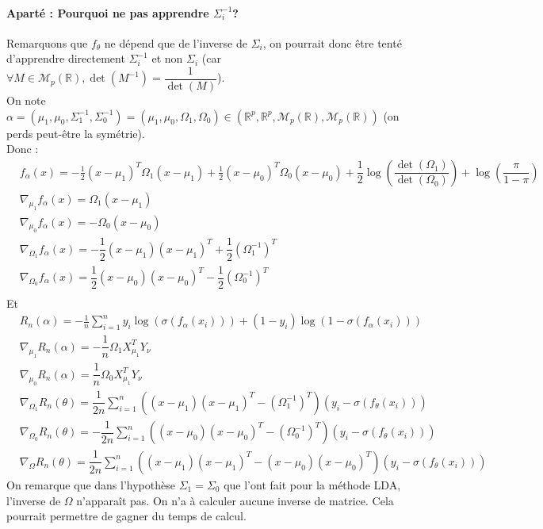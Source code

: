 \documentclass[paper=a4, fontsize=11pt]{article}
\begin{document}
\paragraph{Aparté : Pourquoi ne pas apprendre $\Sigma_i^{-1}$?\\}
Remarquons que $f_{\theta}$ ne dépend que de l'inverse de $\Sigma_i$, on pourrait donc être tenté d'apprendre directement $\Sigma_i^{-1}$ et non $\Sigma_i$ (car $\forall M\in \mathcal{M}_{p}(\mathbb{R}), \det(M^{-1}) = \dfrac{1}{\det(M)}$).\\
On note $\alpha = (\mu_1,\mu_0,\Sigma_1^{-1},\Sigma_0^{-1}) =  (\mu_1,\mu_0,\Omega_1,\Omega_0)\in (\mathbb{R}^{p},\mathbb{R}^{p},\mathcal{M}_{p}(\mathbb{R}),\mathcal{M}_{p}(\mathbb{R}))$ (on perds peut-être la symétrie).\\
Donc : 
\begin{align*}
&f_{\alpha}(x) = -\frac{1}{2}(x-\mu_1)^{T}\Omega_1(x-\mu_1) +  \frac{1}{2}(x-\mu_0)^{T}\Omega_0(x-\mu_0) + \dfrac{1}{2}\log(\dfrac{\det(\Omega_1)}{\det(\Omega_0)}) + \log(\dfrac{\pi}{1-\pi})\\
&\nabla_{\mu_1}f_{\alpha}(x) = \Omega_{1}(x-\mu_{1}) \\
&\nabla_{\mu_0}f_{\alpha}(x) = -\Omega_{0}(x-\mu_{0}) \\
&\nabla_{\Omega_1}f_{\alpha}(x) = -\dfrac{1}{2}(x-\mu_{1})(x-\mu_{1})^{T} +\dfrac{1}{2}(\Omega_1^{-1})^{T}\\
&\nabla_{\Omega_0}f_{\alpha}(x) = \dfrac{1}{2}(x-\mu_{0})(x-\mu_{0})^{T} - \dfrac{1}{2}(\Omega_0^{-1})^{T}\\
\end{align*}
Et 
\begin{align*}
&R_n(\alpha) = -\frac{1}{n}\sum\limits_{i=1}^{n} y_i\log (\sigma(f_{\alpha}(x_i))) + (1-y_i)\log(1-\sigma(f_{\alpha}(x_i)))\\
&\nabla_{\mu_1}R_n(\alpha) = -\dfrac{1}{n}\Omega_{1} X_{\mu_1}^{T}Y_{\nu}\\
&\nabla_{\mu_0}R_n(\alpha) =  \dfrac{1}{n}\Omega_{0} X_{\mu_1}^{T}Y_{\nu}\\
&\nabla_{\Omega_1}R_n(\theta) = \dfrac{1}{2n}\sum\limits_{i=1}^{n}   ((x-\mu_{1})(x-\mu_{1})^{T} -(\Omega_1^{-1})^{T}) (y_i - \sigma(f_{\theta}(x_i))) \\
&\nabla_{\Omega_0}R_n(\theta) = -\dfrac{1}{2n}\sum\limits_{i=1}^{n}   ((x-\mu_{0})(x-\mu_{0})^{T} -(\Omega_0^{-1})^{T}) (y_i - \sigma(f_{\theta}(x_i))) \\
&\nabla_{\Omega}R_n(\theta) = \dfrac{1}{2n}\sum\limits_{i=1}^{n}   ((x-\mu_{1})(x-\mu_{1})^{T}-(x-\mu_{0})(x-\mu_{0})^{T} ) (y_i - \sigma(f_{\theta}(x_i))) 
\end{align*}
On remarque que dans l'hypothèse $\Sigma_1 = \Sigma_0$ que l'ont fait pour la méthode LDA, l'inverse de $\Omega$ n'apparaît pas. On n'a à calculer aucune inverse de matrice. Cela pourrait permettre de gagner du temps de calcul.
\end{document}

